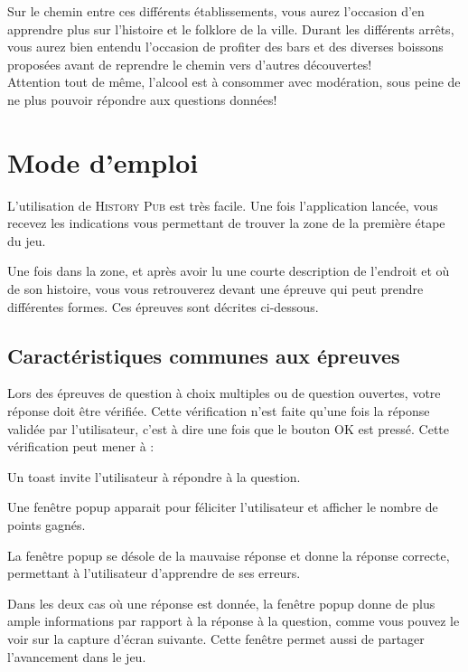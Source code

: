 \documentclass[11pt]{scrreprt}
\begin{document}
    Sur le chemin entre ces différents établissements, vous aurez l'occasion d'en apprendre plus sur l'histoire et le folklore de la ville. Durant les différents arrêts, vous aurez bien entendu l'occasion de profiter des bars et des diverses boissons proposées avant de reprendre le chemin vers d'autres découvertes!\\

    Attention tout de même, l'alcool est à consommer avec modération, sous peine de ne plus pouvoir répondre aux questions données!\\

    \chapter{Mode d'emploi}
    L'utilisation de \textsc{History Pub} est très facile. Une fois l'application lancée, vous recevez les indications vous permettant de trouver la zone de la première étape du jeu.


    Une fois dans la zone, et après avoir lu une courte description de l'endroit et où de son histoire, vous vous retrouverez devant une épreuve qui peut prendre différentes formes. Ces épreuves sont décrites ci-dessous.

    \section{Caractéristiques communes aux épreuves}
    Lors des épreuves de question à choix multiples ou de question ouvertes, votre réponse doit être vérifiée. Cette vérification n'est faite qu'une fois la réponse validée par l'utilisateur, c'est à dire une fois que le bouton OK est pressé. Cette vérification peut mener à :
    \begin{description}[style=nextline]
        \item[Pas de réponse donnée]Un toast invite l'utilisateur à répondre à la question.
        \item[Réponse correcte]Une fenêtre popup apparait pour féliciter l'utilisateur et afficher le nombre de points gagnés.
        \item[Réponse incorrecte]La fenêtre popup se désole de la mauvaise réponse et donne la réponse correcte, permettant à l'utilisateur d'apprendre de ses erreurs.
    \end{description}
    Dans les deux cas où une réponse est donnée, la fenêtre popup donne de plus ample informations par rapport à la réponse à la question, comme vous pouvez le voir sur la capture d'écran suivante. Cette fenêtre permet aussi de partager l'avancement dans le jeu.
\end{document}
